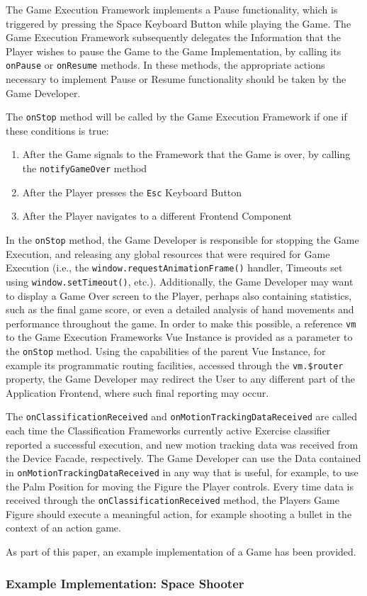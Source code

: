 The Game Execution Framework implements a Pause functionality, which is triggered by pressing the Space Keyboard Button while playing the Game. The Game Execution Framework subsequently delegates the Information that the Player wishes to pause the Game to the Game Implementation, by calling its \texttt{onPause} or \texttt{onResume} methods. In these methods, the appropriate actions necessary to implement Pause or Resume functionality should be taken by the Game Developer.

The \texttt{onStop} method will be called by the Game Execution Framework if one if these conditions is true:

\begin{enumerate}
   \item After the Game signals to the Framework that the Game is over, by calling the \texttt{notifyGameOver} method
   \item After the Player presses the \texttt{Esc} Keyboard Button
   \item After the Player navigates to a different Frontend Component 
\end{enumerate}

\noindent
In the \texttt{onStop} method, the Game Developer is responsible for stopping the Game Execution, and releasing any global resources that were required for Game Execution (i.e., the \texttt{window.requestAnimationFrame()} handler, Timeouts set using \texttt{window.setTimeout()}, etc.). Additionally, the Game Developer may want to display a Game Over screen to the Player, perhaps also containing statistics, such as the final game score, or even a detailed analysis of hand movements and performance throughout the game. In order to make this possible, a reference \texttt{vm} to the Game Execution Frameworks Vue Instance is provided as a parameter to the \texttt{onStop} method. Using the capabilities of the parent Vue Instance, for example its programmatic routing facilities, accessed through the \texttt{vm.\$router} property, the Game Developer may redirect the User to any different part of the Application Frontend, where such final reporting may occur.

The \texttt{onClassificationReceived} and \texttt{onMotionTrackingDataReceived} are called each time the Classification Frameworks currently active Exercise classifier reported a successful execution, and new motion tracking data was received from the Device Facade, respectively. The Game Developer can use the Data contained in \texttt{onMotionTrackingDataReceived} in any way that is useful, for example, to use the Palm Position for moving the Figure the Player controls. Every time data is received through the \texttt{onClassificationReceived} method, the Players Game Figure should execute a meaningful action, for example shooting a bullet in the context of an action game.

As part of this paper, an example implementation of a Game has been provided.

\subsubsection{Example Implementation: Space Shooter}
